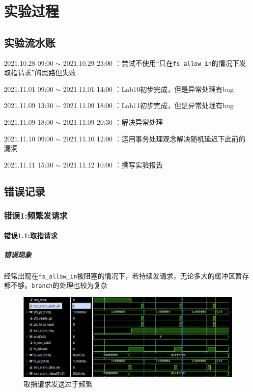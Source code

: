 \documentclass[UTF-8,twoside,c5size]{ctexart}
\begin{document}
	\section{实验过程}
	
	\subsection{实验流水账}
	
	2021.10.28 09:00 $\sim$ 2021.10.29 23:00 ：尝试不使用“只在\texttt{fs_allow_in}的情况下发取指请求”的思路但失败
	
	2021.11.01 09:00 $\sim$ 2021.11.01 14:00 ：Lab10初步完成，但是异常处理有bug
	
	2021.11.09 13:30 $\sim$ 2021.11.09 18:00 ：Lab11初步完成，但是异常处理有bug
	
	2021.11.09 18:00 $\sim$ 2021.11.09 20:30 ：解决异常处理
	
	2021.11.10 09:00 $\sim$ 2021.11.10 12:00 ：运用事务处理观念解决随机延迟下此前的漏洞
	
	2021.11.11 15:30 $\sim$ 2021.11.12 10:00 ：撰写实验报告
	
	\subsection{错误记录}	
	\subsubsection{错误\textbf{1:}频繁发请求}
	
	\paragraph{错误\textbf{1.1:}取指请求}\hfill
	
	\subparagraph{错误现象}\hfill
	
	经常出现在\texttt{fs_allow_in}被阻塞的情况下，若持续发请求，无论多大的缓冲区暂存都不够。\texttt{branch}的处理也较为复杂
	
	\begin{figure}[h]
		\centering
		\includegraphics[width=0.85\linewidth]{inst_req_frequently.png}
		\caption[inst_req_frequently]{取指请求发送过于频繁}
		\label{fig:inst_req_frequently}
	\end{figure}
	
\end{document}

